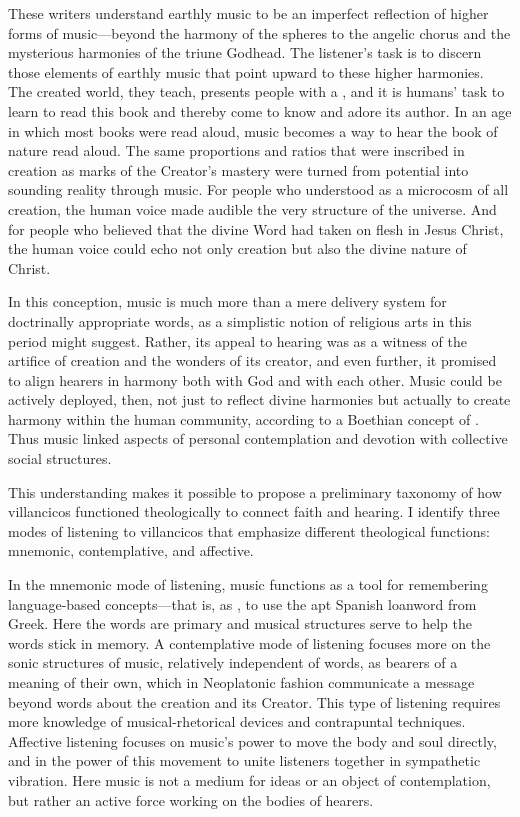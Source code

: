 \documentclass[tt]{vcbook-proposal}
\begin{document}
These writers understand earthly music to be an imperfect reflection of higher forms of music---beyond the harmony of the spheres to the angelic chorus and the mysterious harmonies of the triune Godhead. 
The listener's task is to discern those elements of earthly music that point upward to these higher harmonies.
The created world, they teach, presents people with a , and it is humans' task to learn to read this book and thereby come to know and adore its author.
In an age in which most books were read aloud, music becomes a way to hear the book of nature read aloud.
The same proportions and ratios that were inscribed in creation as marks of the Creator's mastery were turned from potential into sounding reality through music. 
For people who understood  as a microcosm of all creation, the human voice made audible the very structure of the universe.
And for people who believed that the divine Word had taken on flesh in Jesus Christ, the human voice could echo not only creation but also the divine nature of Christ.

In this conception, music is much more than a mere delivery system for doctrinally appropriate words, as a simplistic notion of religious arts in this period might suggest.
Rather, its appeal to hearing was as a witness of the artifice of creation and the wonders of its creator, and even further, it promised to align hearers in harmony both with God and with each other.
Music could be actively deployed, then, not just to reflect divine harmonies but actually to create harmony within the human community, according to a Boethian concept of .
Thus music linked aspects of personal contemplation and devotion with collective social structures.

This understanding makes it possible to propose a preliminary taxonomy of how villancicos functioned theologically to connect faith and hearing. 
I identify three modes of listening to villancicos that emphasize different theological functions: mnemonic, contemplative, and affective.

In the mnemonic mode of listening, music functions as a tool for remembering language-based concepts---that is, as , to use the apt Spanish loanword from Greek.
Here the words are primary and musical structures serve to help the words stick in memory.
A contemplative mode of listening focuses more on the sonic structures of  music, relatively independent of words, as bearers of a meaning of their own, which in Neoplatonic fashion communicate a message beyond words about the creation and its Creator.
This type of listening requires more knowledge of musical-rhetorical devices and contrapuntal techniques. 
Affective listening focuses on music's power to move the body and soul directly, and in the power of this movement to unite listeners together in sympathetic vibration.
Here music is not a medium for ideas or an object of contemplation, but rather an active force working on the bodies of hearers.
\end{document}
